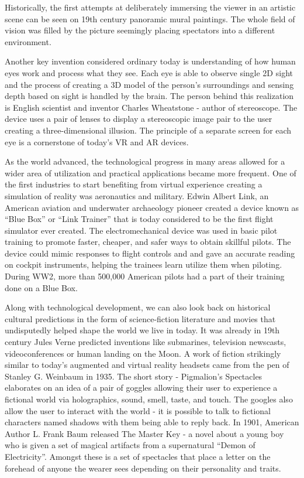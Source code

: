 \documentclass[12pt, a4paper]{article}
\begin{document}
Historically, the first attempts at deliberately immersing the viewer in an artistic scene can be seen on 19th century panoramic mural paintings. The whole field of vision was filled by the picture seemingly placing spectators into a different environment.

Another key invention considered ordinary today is understanding of how human eyes work and process what they see. Each eye is able to observe single 2D sight and the process of creating a 3D model of the person’s surroundings and sensing depth based on sight is handled by the brain. The person behind this realization is English scientist and inventor Charles Wheatstone - author of stereoscope. The device uses a pair of lenses to display a stereoscopic image pair to the user creating a three-dimensional illusion. The principle of a separate screen for each eye is a cornerstone of today’s VR and AR devices.

As the world advanced, the technological progress in many areas allowed for a wider area of utilization and practical applications became more frequent. One of the first industries to start benefiting from virtual experience creating a simulation of reality was aeronautics and military. Edwin Albert Link, an American aviation and underwater archaeology pioneer created a device known as “Blue Box” or “Link Trainer” that is today considered to be the first flight simulator ever created. The electromechanical device was used in basic pilot training to promote faster, cheaper, and safer ways to obtain skillful pilots. The device could mimic responses to flight controls and and gave an accurate reading on cockpit instruments, helping the trainees learn utilize them when piloting. During WW2, more than 500,000 American  pilots had a part of their training done on a Blue Box.

Along with technological development, we can also look back on historical cultural predictions in the form of science-fiction literature and movies that undisputedly helped shape the world we live in today. It was already in 19th century Jules Verne predicted inventions like submarines, television newscasts, videoconferences or human landing on the Moon. A work of fiction strikingly similar to today’s augmented and virtual reality headsets came from the pen of  Stanley G. Weinbaum in 1935. The short story - Pigmalion’s Spectacles elaborates on an idea of a pair of goggles allowing their user to experience a fictional world via holographics, sound, smell, taste, and touch. The googles also allow the user to interact with the world - it is possible to talk to fictional characters named shadows with them being able to reply back. In 1901, American Author L. Frank Baum released The Master Key - a novel about a young boy who is given a set of magical artifacts from a supernatural “Demon of Electricity”. Amongst these is a set of spectacles that place a letter on the forehead of anyone the wearer sees depending on their personality and traits.
\end{document}

